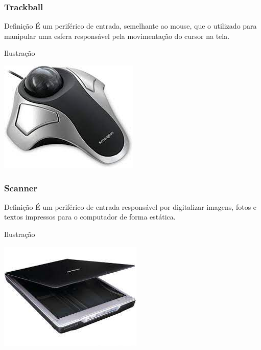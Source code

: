 \documentclass[aspectratio=169]{beamer} %
\begin{document}
\begin{frame}
	\frametitle{Trackball}
	
	\begin{block}{Defini\c cão}
		É um periférico de entrada,  semelhante ao mouse,  que o utilizado para manipular uma esfera responsável pela movimenta\c cão do cursor na tela.
	\end{block}\vfill
	
	\begin{exampleblock}{Ilustra\c cão}
		\begin{center}
			\includegraphics[scale=0.4]{img/trackball}
		\end{center}		
	\end{exampleblock}
\end{frame}

\begin{frame}
	\frametitle{Scanner}
	
	\begin{block}{Defini\c cão}
		É um periférico de entrada responsável por digitalizar imagens, fotos e textos impressos para o computador de forma estática.
	\end{block}\vfill
	
	\begin{exampleblock}{Ilustra\c cão}
		\begin{center}
			\includegraphics[scale=0.4]{img/scanner}
		\end{center}				
	\end{exampleblock}
\end{frame}
\end{document}
